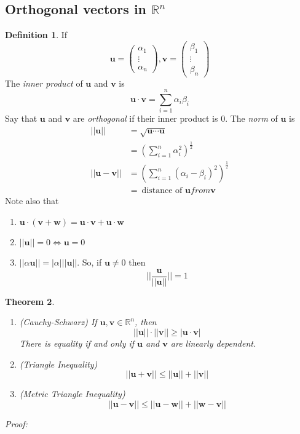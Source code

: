 \documentclass{report}
\newtheorem{theorem}{Theorem}[subsection]
\theoremstyle{remark}
\theoremstyle{definition}
\newtheorem{definition}[theorem]{Definition}
\theoremstyle{definition}
\theoremstyle{theorem}
\renewcommand{\v}[1]{\mathbf{#1}}
\providecommand{\vectiii}[3]{\begin{pmatrix}#1\\#2\\#3\end{pmatrix}}
\begin{document}
\subsection{Orthogonal vectors in $\mathbb{R}^n$}
\begin{definition}
If 
\[\v{u}=\vectiii{\alpha_1}{\vdots}{\alpha_n}, \v{v} = \vectiii{\beta_1}{\vdots}{\beta_n}\]
The \emph{inner product} of $\v{u}$ and $\v{v}$ is
\[\v{u}\cdot\v{v}=\sum^n_{i=1}\alpha_i\beta_i\]
Say that $\v{u}$ and $\v{v}$ are \emph{orthogonal} if their inner product is 0. The \emph{norm} of $\v{u}$ is
\begin{align*}
    ||\v{u}|| &= \sqrt{\v{u}\cdots\v{u}}\\
    &=\left(\sum_{i=1}^n\alpha_i^2\right)^{\frac{1}{2}}\\
    ||\v{u}-\v{v}||&=\left(\sum_{i=1}^n(\alpha_i-\beta_i)^2\right)^{\frac{1}{2}}\\
    &= \> \text{distance of $\v{u} from \v{v}$}
\end{align*}
Note also that
\begin{enumerate}[label=(\arabic*)]
    \item $\v{u}\cdot(\v{v}+\v{w})=\v{u}\cdot \v{v} + \v{u} \cdot \v{w}$
    \item $||\v{u}||=0 \iff \v{u}=0$
    \item $||\alpha\v{u}||=|\alpha|||\v{u}||$. So, if $\v{u}\neq 0$ then
    \[||\frac{\v{u}}{||\v{u}||}||=1\]
\end{enumerate}
\end{definition}
\begin{theorem}
\begin{enumerate}[label=\arabic*)]
    \item (Cauchy-Schwarz) If $\v{u},\v{v} \in \mathbb{R}^n$, then 
    \[||\v{u}||\cdot||\v{v}||\geq |\v{u}\cdot\v{v}|\] There is equality if and only if $\v{u}$ and $\v{v}$ are linearly dependent.
    \item (Triangle Inequality) 
    \[||\v{u}+\v{v}|| \leq ||\v{u}|| + ||\v{v}||\]
    \item (Metric Triangle Inequality)
    \[||\v{u}-\v{v}||\leq ||\v{u}-\v{w}|| + ||\v{w}-\v{v}||\]
\end{enumerate}
\end{theorem}
\emph{Proof:}
\end{document}
